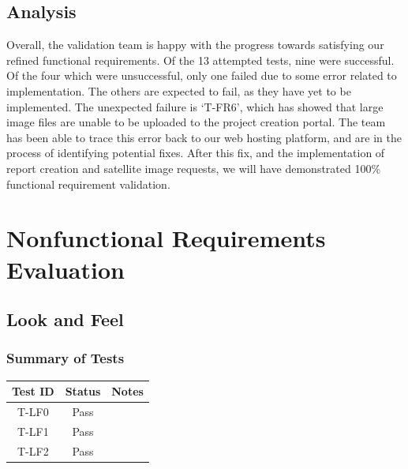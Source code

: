 \documentclass[12pt, titlepage]{article}
\begin{document}
\subsection{Analysis}

Overall, the validation team is happy with the progress towards satisfying our refined functional requirements. Of the 13 attempted tests, nine were successful. Of the four which were unsuccessful,
only one failed due to some error related to implementation. The others are expected to fail, as they have yet to be implemented. The unexpected failure is `T-FR6', which has showed that large image files are unable to be uploaded to the 
project creation portal. The team has been able to trace this error back to our web hosting platform, and are in the process of identifying potential fixes. After this fix, and the implementation of report creation and satellite image requests, we will have demonstrated 100\% functional requirement validation.

\section{Nonfunctional Requirements Evaluation}
\subsection{Look and Feel}
\subsubsection{Summary of Tests}
\begin{center}
    \begin{tabular}{|c|c|l|}
        \hline
        \textbf{Test ID} & \textbf{Status} & \textbf{Notes}\\
        \hline
        T-LF0 & Pass & \\
        T-LF1 & Pass & \\
        T-LF2 & Pass & \\
        \hline
    \end{tabular}
\end{center}
    
\end{document}
